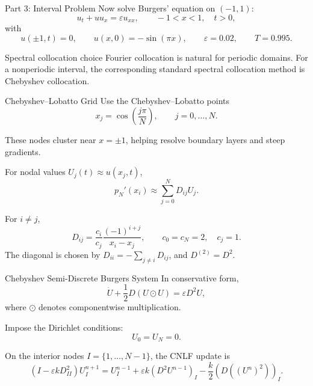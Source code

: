 \documentclass[aspectratio=169,11pt]{beamer}
\begin{document}
\begin{frame}{Part 3: Interval Problem}
    Now solve Burgers' equation on $(-1,1)$:
    \begin{equation}
        u_t+u u_x=\varepsilon u_{xx},
        \qquad -1<x<1,\quad t>0,
    \end{equation}
    with
    \begin{equation}
        u(\pm1,t)=0,\qquad
        u(x,0)=-\sin(\pi x),\qquad
        \varepsilon=0.02,\qquad
        T=0.995.
    \end{equation}

    \begin{block}{Spectral collocation choice}
        Fourier collocation is natural for periodic domains. For a nonperiodic interval, the corresponding standard spectral collocation method is Chebyshev collocation.
    \end{block}
\end{frame}

\begin{frame}{Chebyshev--Lobatto Grid}
    Use the Chebyshev--Lobatto points
    \begin{equation}
        x_j=\cos\left(\frac{j\pi}{N}\right),
        \qquad j=0,\ldots,N.
    \end{equation}

    These nodes cluster near $x=\pm1$, helping resolve boundary layers and steep gradients.

    For nodal values $U_j(t)\approx u(x_j,t)$,
    \begin{equation}
        p_N'(x_i)\approx\sum_{j=0}^N D_{ij}U_j.
    \end{equation}

    For $i\neq j$,
    \begin{equation}
        D_{ij}=
        \frac{c_i}{c_j}
        \frac{(-1)^{i+j}}{x_i-x_j},
        \qquad
        c_0=c_N=2,\quad c_j=1.
    \end{equation}
    The diagonal is chosen by $D_{ii}=-\sum_{j\neq i}D_{ij}$, and $D^{(2)}=D^2$.
\end{frame}

\begin{frame}{Chebyshev Semi-Discrete Burgers System}
    In conservative form,
    \begin{equation}
        \dot U+\frac12D(U\odot U)=\varepsilon D^2U,
    \end{equation}
    where $\odot$ denotes componentwise multiplication.

    Impose the Dirichlet conditions:
    \begin{equation}
        U_0=U_N=0.
    \end{equation}

    On the interior nodes $I=\{1,\ldots,N-1\}$, the CNLF update is
    \begin{equation}
        (I-\varepsilon kD^2_{II})U_I^{n+1}
        =
        U_I^{n-1}
        +\varepsilon k(D^2U^{n-1})_I
        -\frac{k}{2}\left(D((U^n)^2)\right)_I.
    \end{equation}
\end{frame}
\end{document}
